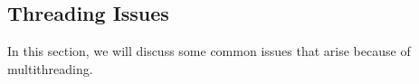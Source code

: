 \subsection{Threading Issues}\label{subsec:Threading_Issues}
In this section, we will discuss some common issues that arise because of multithreading.


